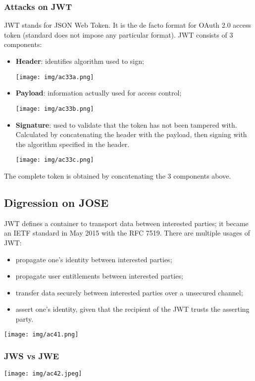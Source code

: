 \documentclass[a4paper, 10pt, titlepage]{article}
\begin{document}
\subsubsection{Attacks on JWT}
JWT stands for JSON Web Token. It is the de facto format for OAuth 2.0 access token (standard does not impose any particular format).
JWT consists of 3 components:
\begin{itemize}
\item \textbf{Header}: identifies algorithm used to sign;
\begin{center}
\texttt{[image: img/ac33a.png]}
\end{center}
\item \textbf{Payload}: information actually used for access control;
\begin{center}
\texttt{[image: img/ac33b.png]}
\end{center}
\item \textbf{Signature}: used to validate that the token has not been tampered with. Calculated by concatenating the header with the payload, then signing with the algorithm specified in the header.
\begin{center}
\texttt{[image: img/ac33c.png]}
\end{center}
\end{itemize}
The complete token is obtained by concatenating the 3 components above.


\subsection{Digression on JOSE}
JWT defines a container to transport data between interested parties; it became an IETF standard in May 2015 with the RFC 7519. There are multiple usages of JWT:
\begin{itemize}
\item propagate one’s identity between interested parties;
\item propagate user entitlements between interested parties;
\item transfer data securely between interested parties over a unsecured channel;
\item assert one’s identity, given that the recipient of the JWT trusts the asserting party.
\end{itemize}
\begin{center}
\texttt{[image: img/ac41.png]}
\end{center}

\subsubsection{JWS vs JWE}
\begin{center}
\texttt{[image: img/ac42.jpeg]}
\end{center}
\end{document}
